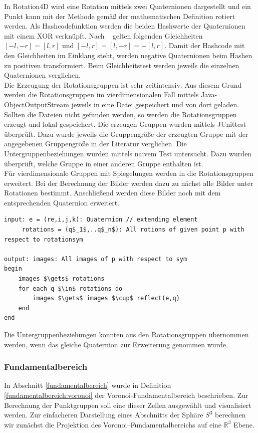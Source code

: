 In Rotation4D wird eine Rotation mittels zwei Quaternionen dargestellt und ein Punkt kann mit der Methode gemäß der mathematischen Definition rotiert werden. Als Hashcodefunktion werden die beiden Hashwerte der Quaternionen mit einem XOR verknüpft. Nach ~\cite{conway2003} gelten folgenden Gleichheiten
$[-l,-r] = [l,r]$ und $[-l,r]=[l,-r]=-[l,r]$. Damit der Hashcode mit den Gleichheiten im Einklang steht, werden negative Quaternionen beim Hashen zu positiven transformiert. Beim Gleichheitstest werden jeweils die einzelnen Quaternionen verglichen.\\
Die Erzeugung der Rotationsgruppen ist sehr zeitintensiv. Aus diesem Grund werden die Rotationsgruppen im vierdimensionalen Fall mittels Java-ObjectOutputStream jeweils in eine Datei gespeichert und von dort geladen. Sollten die Dateien nicht gefunden werden, so werden die Rotationsgruppen erzeugt und lokal gespeichert. Die erzeugen Gruppen wurden mittels JUnittest überprüft. Dazu wurde jeweils die Gruppengröße der erzeugten Gruppe mit der angegebenen Gruppengröße in der Literatur verglichen. Die Untergruppenbeziehungen wurden mittels naivem Test untersucht. Dazu wurden überprüft, welche Gruppe in einer anderen Gruppe enthalten ist.\\
Für vierdimensionale Gruppen mit Spiegelungen werden in die Rotationsgruppen erweitert. Bei der Berechnung der Bilder werden dazu zu nächst alle Bilder unter Rotationen bestimmt. Anschließend werden diese Bilder noch mit dem entsprechenden Quaternion erweitert.
\begin{lstlisting}[mathescape, morekeywords={for, each, if, then, fi, do, begin,input, output, end, return}, caption={Peusdocode für Bilder unter Spiegelungen}, label=alg:images2]
input: e = (re,i,j,k): Quaternion // extending element
	 rotations = (q$_1$,..q$_n$): All rotions of given point p with respect to rotationsym
	
output: images: All images of p with respect to sym
begin	
	images $\gets$ rotations
	for each q $\in$ rotations do
		images $\gets$ images $\cup$ reflect(e,q)
	end
end 
\end{lstlisting}
Die Untergruppenbeziehungen konnten aus den Rotationsgruppen übernommen werden, wenn das gleiche Quaternion zur Erweiterung genommen wurde.
\\ 


    \subsubsection{Fundamentalbereich}
         In Abschnitt \ref{fundamentalbereich} wurde in Definition \ref{fundamentalbereich:voronoi} der Voronoi-Fundamentalbereich beschrieben. Zur Berechnung der Punktgruppen soll eine dieser Zellen ausgewählt und visualisiert werden.
         Zur einfacheren Darstellung eines Abschnitts der Sphäre $S^3$ berechnen wir zunächst die Projektion des Voronoi--Fundamentalbereichs auf eine $\mathbb{R}^3$ Ebene.
